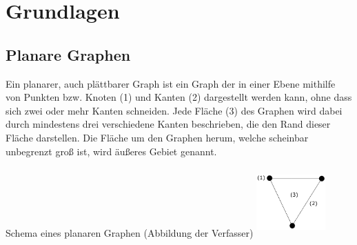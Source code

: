 \chapter{Grundlagen}
\section{Planare Graphen}
Ein planarer, auch plättbarer Graph ist ein Graph der in einer Ebene mithilfe von Punkten bzw. Knoten (1) und Kanten (2) dargestellt werden kann, ohne dass sich zwei oder mehr Kanten schneiden. 
Jede Fläche (3) des Graphen wird dabei durch mindestens drei verschiedene Kanten beschrieben, die den Rand dieser Fläche darstellen. 
Die Fläche um den Graphen herum, welche scheinbar unbegrenzt groß ist, wird äußeres Gebiet genannt.
\begin{Bild}{Schema eines planaren Graphen (Abbildung der Verfasser)}
	\includegraphics[width = 100px, height = 100px]{Bilder/Graph_Scheme}
\end{Bild}

